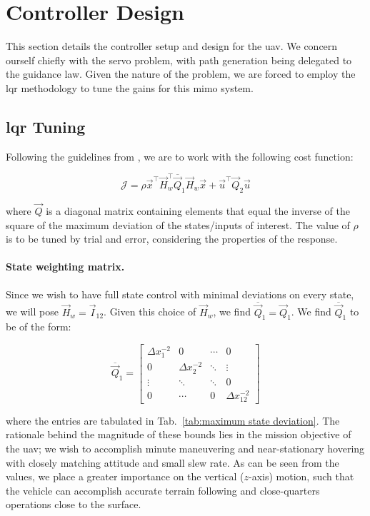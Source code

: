 \section{Controller Design}

This section details the controller setup and design for the \gls{uav}. We concern ourself chiefly with the servo problem, with path generation being delegated to the guidance law. Given the nature of the problem, we are forced to employ the \gls{lqr} methodology to tune the gains for this \gls{mimo} system.
	
\subsection{\gls{lqr} Tuning}

Following the guidelines from \citep{Franklin2002}, we are to work with the following cost function:

\begin{equation}
	\mathcal{J} = \rho \vec{x}^\intercal \vec{H}_w^\intercal \overline{\vec{Q}}_1 \vec{H}_w \vec{x} + \vec{u}^\intercal \vec{Q}_2 \vec{u}
\end{equation}

where $\vec{Q}$ is a diagonal matrix containing elements that equal the inverse of the square of the maximum deviation of the states/inputs of interest. The value of $\rho$ is to be tuned by trial and error, considering the properties of the response.

\paragraph{State weighting matrix.} Since we wish to have full state control with minimal deviations on every state, we will pose $\vec{H}_w = \vec{I}_{12}$. Given this choice of $\vec{H}_w$, we find $\overline{\vec{Q}}_1 = \vec{Q}_1$. We find $\overline{\vec{Q}}_1$ to be of the form:

\begin{equation}
	\overline{\vec{Q}}_1 =
	\begin{bmatrix}
		\Delta x_1^{-2} & 0 & \cdots & 0 \\
		0 & \Delta x_2^{-2} & \ddots & \vdots \\
		\vdots & \ddots & \ddots & 0 \\
		0 & \cdots & 0 & \Delta x_{12}^{-2} 
	\end{bmatrix}
\end{equation}

where the entries are tabulated in Tab.~\ref{tab:maximum state deviation}. The rationale behind the magnitude of these bounds lies in the mission objective of the \gls{uav}; we wish to accomplish minute maneuvering and near-stationary hovering with closely matching attitude and small slew rate. As can be seen from the values, we place a greater importance on the vertical ($z$-axis) motion, such that the vehicle can accomplish accurate terrain following and close-quarters operations close to the surface.

